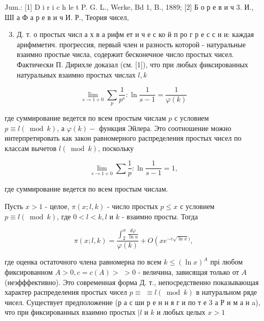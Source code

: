 \documentclass[10pt]{article}
\begin{document}
Jum.: [1] D i r i c h le t P. G. L., Werke, Bd 1, B., 1889; [2] Б о р е в и ч 3. И., ШІ а Ф а р е в и ч И. Р., Теория чисел,



\begin{enumerate}

  \setcounter{enumi}{2}

  \item Д. т. о простых числ а х в а рифм ет и ч е с ко й п ро г р е с с и и: каждая арифмметич. прогрессия, первый член и разность которой - натуральные взаимно простые числа, содержит бесконечное число простых чисел. Фактически П. Дирихле доказал (см. [1]), что при любых фиксированных натуральных взаимно простых числах $l, k$

\end{enumerate}



\[

\lim _{s \rightarrow 1+0} \sum_{p} \frac{1}{p^{s}}: \ln \frac{1}{s-1}=\frac{1}{\varphi(k)}

\]



где суммирование ведется по всем простым числам $p$ с условием $p \equiv l(\bmod k)$, а $\varphi(k)-$ функция Эйлера. Это соотношение можно интерпретировать как закон равномерного распределения простых чисел по классам вычетов $l(\bmod k)$, поскольку



\[

\lim _{s \rightarrow 1+0} \sum \frac{1}{p}: \ln \frac{1}{s-1}=1,

\]



где суммирование ведется по всем простым числам.



Пусть $x>1$ - целое, $\pi(x ; l, k)$ - число простых $p \leqslant x$ с условием $p \equiv l(\bmod k)$, где $0<l<k, l$ и $k$ - взаимно просты. Тогда



\[

\pi(x ; l, k)=\frac{\int_{2}^{x} \frac{d \varphi}{\ln u}}{\varphi(k)}+O\left(x e^{-c \sqrt{\ln x})},\right.

\]



где оценка остаточного члена равномерна по всем $k \leqslant(\ln x)^{A}$ прі любом фиксированном $A>0, c=c(A)>$ $>0$ - величина, зависящая только от $A$ (неэфффективно). Это современная форма Д. т., непосредственно показывающая характер распределения простых чисел $p \equiv$ $\equiv l(\bmod k)$ в натуральном ряде чисел. Существует предположение (р а с ши р е н н я г и по т е 3 а Р и м а н a), что при фиксированных взаимно простых $\mid l$ и $k$ и любых целых $x>1$
\end{document}
